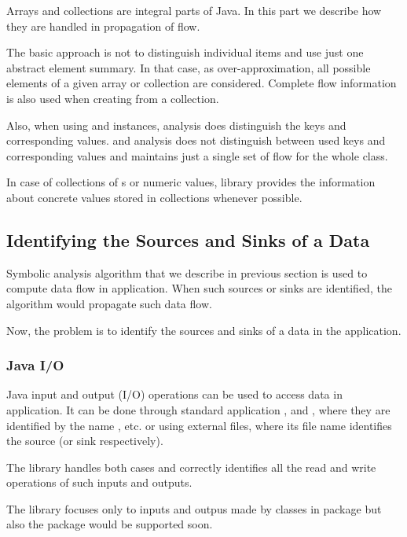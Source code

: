 Arrays and collections are integral parts of Java. In this part we describe how
they are handled in propagation of flow.

The basic approach is not to distinguish individual items and use just one
abstract element summary. In that case, as over-approximation, all possible elements
of a given array or collection are considered.
Complete flow information is also used when creating 
from a collection.

Also, when using  and  instances,
analysis does distinguish the keys and corresponding values.
and 
analysis does not distinguish between used keys and corresponding values
and maintains just a single set of flow for the whole class.

In case of collections of s or numeric values, library provides
the information about concrete values stored in collections whenever possible.





\subsection{Identifying the Sources and Sinks of a Data}

Symbolic analysis algorithm that we describe in previous section is
used to compute data flow in application.
When such sources or sinks are identified, the algorithm would
propagate such data flow.

Now, the problem is to identify the sources and sinks of a data
in the application.




\subsubsection{Java I/O}

Java input and output (I/O) operations can be used to access data in application.
It can be done through standard application
,  and ,
where they are identified by the name , etc.
or using external files, where its file name identifies the source (or sink respectively).

The library handles both cases and correctly identifies
all the read and write operations of such inputs and outputs.

The library focuses only to inputs and outpus made by classes in  package
but also the  package would be supported soon.




